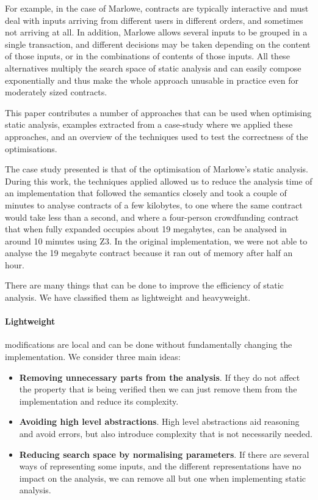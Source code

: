 \documentclass[english,runningheads]{llncs}
\begin{document}
For example, in the case of Marlowe, contracts are typically interactive
and must deal with inputs arriving from different users in different
orders, and sometimes not arriving at all. In addition, Marlowe allows
several inputs to be grouped in a single transaction, and different
decisions may be taken depending on the content of those inputs, or
in the combinations of contents of those inputs. All these alternatives
multiply the search space of static analysis and can easily compose
exponentially and thus make the whole approach unusable in practice
even for moderately sized contracts.

This paper contributes a number of approaches that can be used when
optimising static analysis, examples extracted from a case-study where
we applied these approaches, and an overview of the techniques used
to test the correctness of the optimisations. 

The case study presented is that of the optimisation of Marlowe's
static analysis. During this work, the techniques applied allowed
us to reduce the analysis time of an implementation that followed
the semantics closely and took a couple of minutes to analyse contracts
of a few kilobytes, to one where the same contract would take less
than a second, and where a four-person crowdfunding contract that
when fully expanded occupies about 19 megabytes, can be analysed in
around 10 minutes using Z3. In the original implementation, we were
not able to analyse the 19 megabyte contract because it ran out of
memory after half an hour.

There are many things that can be done to improve the efficiency of
static analysis. We have classified them as lightweight and heavyweight. 

\paragraph*{Lightweight}

modifications are local and can be done without fundamentally changing
the implementation. We consider three main ideas:
\begin{itemize}
\item \textbf{Removing unnecessary parts from the analysis}. If they do not affect
the property that is being verified then we can just remove them from
the implementation and reduce its complexity.
\item \textbf{Avoiding high level abstractions}. High level abstractions aid reasoning
and avoid errors, but also introduce complexity that is not necessarily
needed.
\item \textbf{Reducing search space by normalising parameters}. If there are several
ways of representing some inputs, and the different representations
have no impact on the analysis, we can remove all but one when
implementing static analysis.
\end{itemize}
\end{document}

